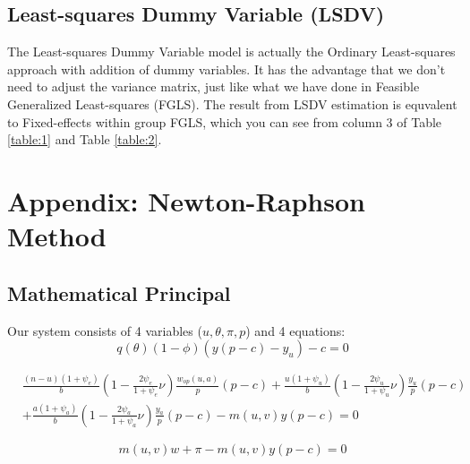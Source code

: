 \documentclass[ %
    final,
    scrbook,
    listoffigures,
    listoftables, 
    glossary]{cu-thesis}
\begin{document}
\subsection{Least-squares Dummy Variable (LSDV)}
The Least-squares Dummy Variable model is actually the Ordinary Least-squares approach with addition of dummy variables. It has the advantage that we don't need to adjust the variance matrix, just like what we have done in Feasible Generalized Least-squares (FGLS). The result from LSDV estimation is equvalent to Fixed-effects within group FGLS, which you can see from column 3 of Table \ref{table:1} and Table \ref{table:2}.


\section{Appendix: Newton-Raphson Method}
\subsection{Mathematical Principal}
Our system consists of 4 variables ($u, \theta, \pi, p$) and 4 equations:
   \begin{equation}
   q(\theta)(1-\phi)(y(p-c)-y_u)-c = 0
   \end{equation}

   \begin{equation} \label{eq12}
\begin{split}
&\frac{(n-u)(1+\psi_e)}{b}(1-\frac{2\psi_e}{1+\psi_e}\nu)\frac{w_{op}(u,a)}{p}(p-c)+\frac{u(1+\psi_u)}{b}(1-\frac{2\psi_u}{1+\psi_u}\nu)\frac{y_u}{p}(p-c)\\
&+\frac{a(1+\psi_a)}{b}(1-\frac{2\psi_a}{1+\psi_a}\nu)\frac{y_a}{p}(p-c)-m(u,v)y(p-c)=0
\end{split}
\end{equation}

   \begin{equation}
    m(u,v)w+\pi-m(u,v)y(p-c)=0
   \end{equation}
\end{document}
